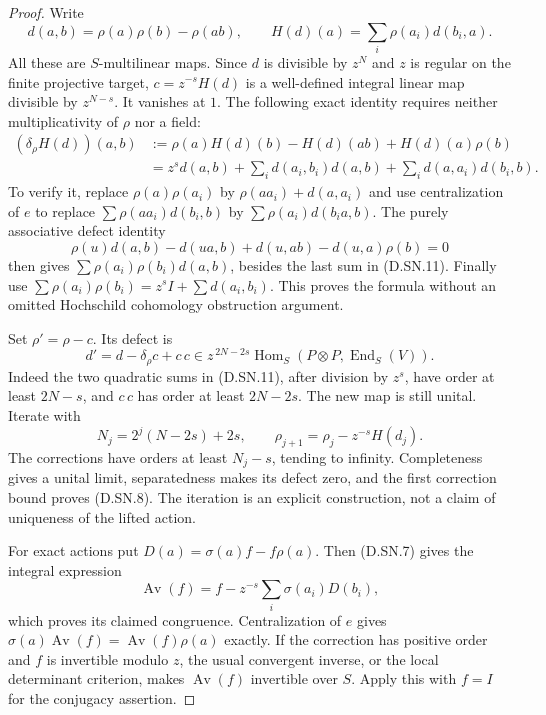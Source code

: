\begin{proof}
Write
\[
 d(a,b)=\rho(a)\rho(b)-\rho(ab),\qquad
 H(d)(a)=\sum_i\rho(a_i)d(b_i,a).
                                                        \tag{D.SN.10}
\]
All these are $S$-multilinear maps. Since $d$ is divisible by
$z^N$ and $z$ is regular on the finite projective target,
$c=z^{-s}H(d)$ is a well-defined integral linear map divisible
by $z^{N-s}$. It vanishes at $1$. The following exact identity
requires neither multiplicativity of $\rho$ nor a field:
\[
 \begin{split}
 (\delta_\rho H(d))(a,b)
   &:=\rho(a)H(d)(b)-H(d)(ab)+H(d)(a)\rho(b)\\
   &=z^s d(a,b)
      +\sum_i d(a_i,b_i)d(a,b)
      +\sum_i d(a,a_i)d(b_i,b).
 \end{split}                                           \tag{D.SN.11}
\]
To verify it, replace $\rho(a)\rho(a_i)$ by
$\rho(aa_i)+d(a,a_i)$ and use centralization of $e$ to
replace $\sum\rho(aa_i)d(b_i,b)$ by
$\sum\rho(a_i)d(b_i a,b)$. The purely associative defect
identity
\[
 \rho(u)d(a,b)-d(ua,b)+d(u,ab)-d(u,a)\rho(b)=0
                                                        \tag{D.SN.12}
\]
then gives $\sum\rho(a_i)\rho(b_i)d(a,b)$, besides the
last sum in (D.SN.11). Finally use
$\sum\rho(a_i)\rho(b_i)=z^s I+\sum d(a_i,b_i)$.
This proves the formula without an omitted Hochschild
cohomology obstruction argument.

Set $\rho'=\rho-c$. Its defect is
\[
 d'=d-\delta_\rho c+c\,c
       \in z^{\,2N-2s}\operatorname{Hom}_S
             (P\otimes P,\operatorname{End}_S(V)).      \tag{D.SN.13}
\]
Indeed the two quadratic sums in (D.SN.11), after division
by $z^s$, have order at least $2N-s$, and $c\,c$ has order
at least $2N-2s$. The new map is still unital. Iterate with
\[
 N_j=2^j(N-2s)+2s,
 \qquad \rho_{j+1}=\rho_j-z^{-s}H(d_j).               \tag{D.SN.14}
\]
The corrections have orders at least $N_j-s$, tending to
infinity. Completeness gives a unital limit, separatedness
makes its defect zero, and the first correction bound proves
(D.SN.8). The iteration is an explicit construction, not a
claim of uniqueness of the lifted action.

For exact actions put
$D(a)=\sigma(a)f-f\rho(a)$. Then (D.SN.7) gives the
integral expression
\[
 \operatorname{Av}(f)
       =f-z^{-s}\sum_i\sigma(a_i)D(b_i),              \tag{D.SN.15}
\]
which proves its claimed congruence. Centralization of $e$
gives $\sigma(a)\operatorname{Av}(f)
=\operatorname{Av}(f)\rho(a)$ exactly. If the correction
has positive order and $f$ is invertible modulo $z$, the
usual convergent inverse, or the local determinant criterion,
makes $\operatorname{Av}(f)$ invertible over $S$.
Apply this with $f=I$ for the conjugacy assertion.


\end{proof}
